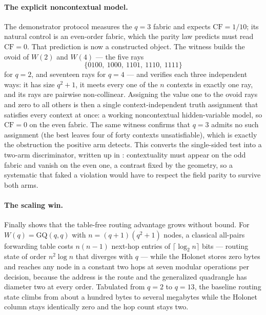\documentclass[11pt]{article}
\begin{document}
\paragraph{The explicit noncontextual model.}  The demonstrator protocol measures
the \(q=3\) fabric and expects \(\mathrm{CF}=1/10\); its natural control is an
even-order fabric, which the parity law predicts must read \(\mathrm{CF}=0\).
That prediction is now a constructed object.  The witness
 builds the ovoid of \(W(2)\) and \(W(4)\) ---
the five rays
\[
  \{0100,\ 1000,\ 1101,\ 1110,\ 1111\}
\]
for \(q=2\), and seventeen rays for \(q=4\) --- and verifies each three
independent ways: it has size \(q^2+1\), it meets every one of the \(n\) contexts
in exactly one ray, and its rays are pairwise non-collinear.  Assigning the value
one to the ovoid rays and zero to all others is then a single context-independent
truth assignment that satisfies every context at once: a working noncontextual
hidden-variable model, so \(\mathrm{CF}=0\) on the even fabric.  The same witness
confirms that \(q=3\) admits no such assignment (the best leaves four of forty
contexts unsatisfiable), which is exactly the obstruction the positive arm
detects.  This converts the single-sided test into a two-arm discriminator,
written up in : contextuality must appear on the
odd fabric and vanish on the even one, a contrast fixed by the geometry, so a
systematic that faked a violation would have to respect the field parity to
survive both arms.

\paragraph{The scaling win.}  Finally  shows
that the table-free routing advantage grows without bound.  For
\(W(q)=\mathrm{GQ}(q,q)\) with \(n=(q+1)(q^2+1)\) nodes, a classical all-pairs
forwarding table costs \(n(n-1)\) next-hop entries of \(\lceil\log_2 n\rceil\)
bits --- routing state of order \(n^2\log n\) that diverges with \(q\) --- while
the Holonet stores zero bytes and reaches any node in a constant two hops at seven
modular operations per decision, because the address is the route and the
generalized quadrangle has diameter two at every order.  Tabulated from \(q=2\) to
\(q=13\), the baseline routing state climbs from about a hundred bytes to several
megabytes while the Holonet column stays identically zero and the hop count stays
two.
\end{document}
